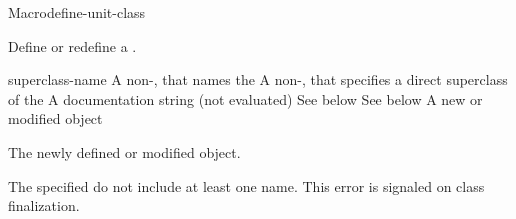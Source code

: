 \documentclass[10pt,twoside,english,pdftex]{article}
\begin{document}

\begin{functiondoc}{Macro}{define-unit-class}{%
    }
%
%
%

\fnsyntax

\fnpurpose Define or redefine a .

\fnpackage {}

\fnmodule {}

\fnargs
\begin{args}{superclass-name}
 A non-\nil,  that names the
 A non-\nil,  that specifies a
direct superclass of the    
\arg[documentation] A documentation string (not evaluated)
 See below
 See below
 A new or modified  object
\end{args}

\fnreturns The newly defined or modified  object.

\fnerrors The specified  do not include at least
one  name.  This error is signaled on class finalization.


\end{functiondoc}
\end{document}

